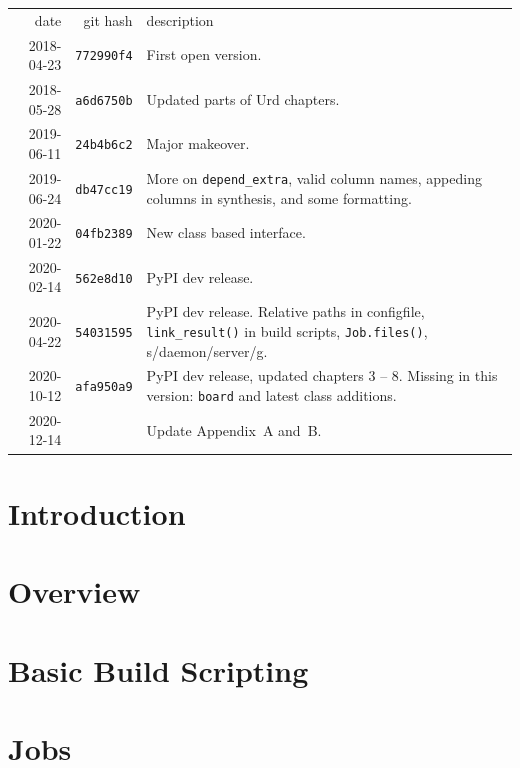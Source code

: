 \documentclass[a4paper]{report}
\newlength{\onechartt}
\newcommand\inputfile[1]{%
    \InputIfFileExists{#1}{}{\typeout{No file #1.}}\hspace{-\onechartt}%
}
\begin{document}
\begin{tabular}{rrp{8cm}}
 date       & git hash          & description\\[0.75ex]
 2018-04-23 & \texttt{772990f4} & First open version.\\
 2018-05-28 & \texttt{a6d6750b} & Updated parts of Urd chapters.\\
 2019-06-11 & \texttt{24b4b6c2} & Major makeover.\\
 2019-06-24 & \texttt{db47cc19} & More on \texttt{depend\_extra}, valid column names, appeding columns in
  synthesis, and some formatting.\\
 2020-01-22 & \texttt{04fb2389} &  New class based interface.\\
 2020-02-14 & \texttt{562e8d10} & PyPI dev release.\\

 2020-04-22 & \texttt{54031595} & PyPI dev release.
 Relative paths in configfile, \texttt{link\_result()} in build
 scripts, \texttt{Job.files()}, s/daemon/server/g.\\

 2020-10-12 & \texttt{afa950a9} & PyPI dev release,
 updated chapters 3 -- 8.  Missing in this version: \texttt{board} and
 latest class additions.\\

 2020-12-14 & \texttt{\inputfile{gitrevision}} & Update Appendix~A and~B.\\
\end{tabular}

\newpage
\tableofcontents

\chapter{Introduction}


\chapter{Overview}


\chapter{Basic Build Scripting}


\chapter{Jobs}

\end{document}
